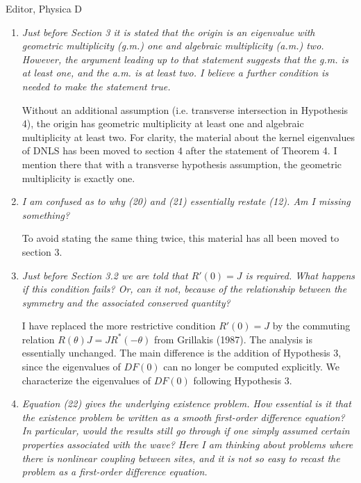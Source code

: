 \documentclass[11pt]{letter}
\begin{document}
\begin{letter}{Editor, Physica D}
\begin{enumerate}
\vspace{4mm}
(Left for Panos.)
\vspace{4mm}

\item \emph{Just before Section 3 it is stated that the origin is an eigenvalue with geometric multiplicity (g.m.) one and algebraic multiplicity (a.m.) two. However, the argument leading up to that statement suggests that the g.m. is at least one, and the a.m. is at least two. I believe a further condition is needed to make the statement true.}

\vspace{4mm}
Without an additional assumption (i.e. transverse intersection in Hypothesis 4), the origin has geometric multiplicity at least one and algebraic multiplicity at least two. For clarity, the material about the kernel eigenvalues of DNLS has been moved to section 4 after the statement of Theorem 4. I mention there that with a transverse hypothesis assumption, the geometric multiplicity is exactly one.
\vspace{4mm}

\item \emph{I am confused as to why (20) and (21) essentially restate (12). Am I missing something?}

\vspace{4mm}
To avoid stating the same thing twice, this material has all been moved to section 3. 
\vspace{4mm}

\item \emph{Just before Section 3.2 we are told that $R'(0) = J$ is required. What happens if this condition fails? Or, can it not, because of the relationship between the symmetry and the associated conserved quantity?}

\vspace{4mm}
I have replaced the more restrictive condition $R'(0) = J$ by the commuting relation $R(\theta) J = J R^*(-\theta)$ from Grillakis (1987). The analysis is essentially unchanged. The main difference is the addition of Hypothesis 3, since the eigenvalues of $DF(0)$ can no longer be computed explicitly. We characterize the eigenvalues of $DF(0)$ following Hypothesis 3.
\vspace{4mm}

\item \emph{Equation (22) gives the underlying existence problem. How essential is it that the existence problem be written as a smooth first-order difference equation? In particular, would the results still go through if one simply assumed certain properties associated with the wave? Here I am thinking about problems where there is nonlinear coupling between sites, and it is not so easy to recast the problem as a first-order difference equation.}


\end{enumerate}
\end{letter}
\end{document}
